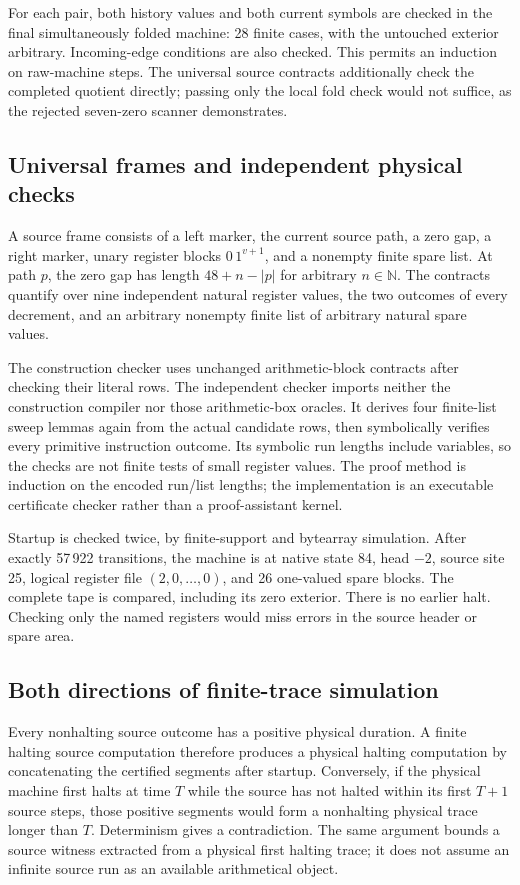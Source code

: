 \documentclass[11pt,letterpaper]{article}
\begin{document}
For each pair, both history values and both current symbols are checked
in the final simultaneously folded machine: 28 finite cases, with the
untouched exterior arbitrary. Incoming-edge conditions are also checked.
This permits an induction on raw-machine steps. The universal source
contracts additionally check the completed quotient directly; passing
only the local fold check would not suffice, as the rejected seven-zero
scanner demonstrates.

\subsection{Universal frames and independent physical checks}
A source frame consists of a left marker, the current source path, a zero
gap, a right marker, unary register blocks $0\,1^{v+1}$, and a nonempty
finite spare list. At path $p$, the zero gap has length $48+n-|p|$ for
arbitrary $n\in\mathbb N$. The contracts quantify over nine independent
natural register values, the two outcomes of every decrement, and an
arbitrary nonempty finite list of arbitrary natural spare values.

The construction checker uses unchanged arithmetic-block contracts after
checking their literal rows. The independent checker imports neither the
construction compiler nor those arithmetic-box oracles. It derives four
finite-list sweep lemmas again from the actual candidate rows, then
symbolically verifies every primitive instruction outcome. Its symbolic
run lengths include variables, so the checks are not finite tests of small
register values. The proof method is induction on the encoded run/list
lengths; the implementation is an executable certificate checker rather
than a proof-assistant kernel.



Startup is checked twice, by finite-support and bytearray simulation.
After exactly 57\,922 transitions, the machine is at native state 84,
head $-2$, source site 25, logical register file $(2,0,\ldots,0)$, and
26 one-valued spare blocks. The complete tape is compared, including its
zero exterior. There is no earlier halt. Checking only the named registers
would miss errors in the source header or spare area.

\subsection{Both directions of finite-trace simulation}
Every nonhalting source outcome has a positive physical duration. A finite
halting source computation therefore produces a physical halting computation
by concatenating the certified segments after startup. Conversely, if the
physical machine first halts at time $T$ while the source has not halted
within its first $T+1$ source steps, those positive segments would form a
nonhalting physical trace longer than $T$. Determinism gives a contradiction.
The same argument bounds a source witness extracted from a physical first
halting trace; it does not assume an infinite source run as an available
arithmetical object.
\end{document}
